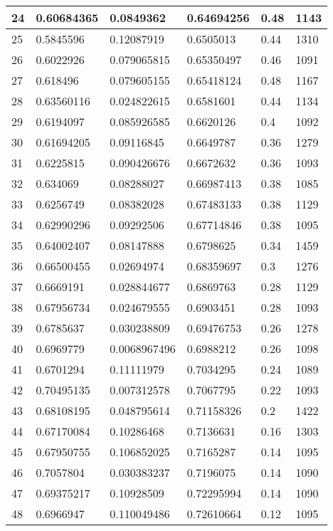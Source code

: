 \begin{longtable}{|l|l|l|l|l|l|}
24 & 0.60684365 & 0.0849362 & 0.64694256 & 0.48 & 1143 \\ \hline 
25 & 0.5845596 & 0.12087919 & 0.6505013 & 0.44 & 1310 \\ \hline 
26 & 0.6022926 & 0.079065815 & 0.65350497 & 0.46 & 1091 \\ \hline 
27 & 0.618496 & 0.079605155 & 0.65418124 & 0.48 & 1167 \\ \hline 
28 & 0.63560116 & 0.024822615 & 0.6581601 & 0.44 & 1134 \\ \hline 
29 & 0.6194097 & 0.085926585 & 0.6620126 & 0.4 & 1092 \\ \hline 
30 & 0.61694205 & 0.09116845 & 0.6649787 & 0.36 & 1279 \\ \hline 
31 & 0.6225815 & 0.090426676 & 0.6672632 & 0.36 & 1093 \\ \hline 
32 & 0.634069 & 0.08288027 & 0.66987413 & 0.38 & 1085 \\ \hline 
33 & 0.6256749 & 0.08382028 & 0.67483133 & 0.38 & 1129 \\ \hline 
34 & 0.62990296 & 0.09292506 & 0.67714846 & 0.38 & 1095 \\ \hline 
35 & 0.64002407 & 0.08147888 & 0.6798625 & 0.34 & 1459 \\ \hline 
36 & 0.66500455 & 0.02694974 & 0.68359697 & 0.3 & 1276 \\ \hline 
37 & 0.6669191 & 0.028844677 & 0.6869763 & 0.28 & 1129 \\ \hline 
38 & 0.67956734 & 0.024679555 & 0.6903451 & 0.28 & 1093 \\ \hline 
39 & 0.6785637 & 0.030238809 & 0.69476753 & 0.26 & 1278 \\ \hline 
40 & 0.6969779 & 0.0068967496 & 0.6988212 & 0.26 & 1098 \\ \hline 
41 & 0.6701294 & 0.11111979 & 0.7034295 & 0.24 & 1089 \\ \hline 
42 & 0.70495135 & 0.007312578 & 0.7067795 & 0.22 & 1093 \\ \hline 
43 & 0.68108195 & 0.048795614 & 0.71158326 & 0.2 & 1422 \\ \hline 
44 & 0.67170084 & 0.10286468 & 0.7136631 & 0.16 & 1303 \\ \hline 
45 & 0.67950755 & 0.106852025 & 0.7165287 & 0.14 & 1095 \\ \hline 
46 & 0.7057804 & 0.030383237 & 0.7196075 & 0.14 & 1090 \\ \hline 
47 & 0.69375217 & 0.10928509 & 0.72295994 & 0.14 & 1090 \\ \hline 
48 & 0.6966947 & 0.110049486 & 0.72610664 & 0.12 & 1095 \\ \hline 

\end{longtable}

